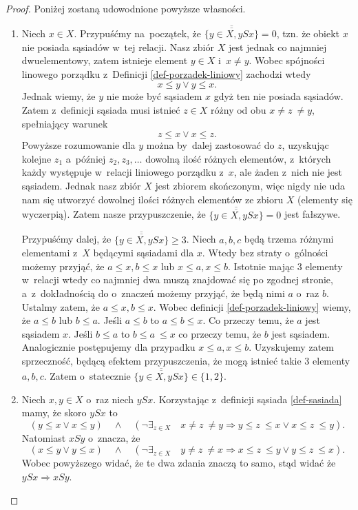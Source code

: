 \documentclass[12pt,a4paper]{report}
\newcommand{\licznosc}[1]{\overline{\overline{#1}}}
\begin{document}
\begin{proof}
Poniżej zostaną udowodnione powyższe własności.
\begin{enumerate}
\item Niech $x \in X$. Przypuśćmy na~początek, że $\licznosc{\{y \in X, ySx\}} = 0$, tzn. że obiekt $x$ nie posiada sąsiadów w~tej relacji. Nasz zbiór $X$ jest jednak co najmniej dwuelementowy, zatem istnieje element $y \in X$ i~$ x \neq y$. Wobec spójności linowego porządku z~Definicji \ref{def-porzadek-liniowy} zachodzi wtedy
$$ x \leq y \lor y \leq x.$$
Jednak wiemy, że $y$ nie może być sąsiadem $x$ gdyż ten nie posiada sąsiadów. Zatem z~definicji sąsiada musi istnieć $z \in X$ różny od obu $x \neq z~\neq y$, spełniający warunek
$$
z \leq x \lor x \leq z.
$$
Powyższe rozumowanie dla $y$ można by~dalej zastosować do $z$, uzyskując kolejne $z_1$ a~później $z_2,z_3, \ldots$ dowolną ilość różnych elementów, z~których każdy występuje w~relacji liniowego porządku z~$x$, ale żaden z~nich nie jest sąsiadem. Jednak nasz zbiór $X$ jest zbiorem skończonym, więc nigdy nie uda nam się utworzyć dowolnej ilości różnych elementów ze zbioru $X$ (elementy się wyczerpią). Zatem nasze przypuszczenie, że $\licznosc{\{y \in X, ySx\}} = 0$ jest fałszywe.

Przypuśćmy dalej, że $\licznosc{\{y \in X, ySx\}} \geq 3$. Niech $a,b,c$ będą trzema różnymi elementami z~$X$ będącymi sąsiadami dla $x$. Wtedy bez straty o~gólności możemy przyjąć, że $a \leq x, b \leq x$ lub $x \leq a, x \leq b$. Istotnie mając 3 elementy w~relacji wtedy co najmniej dwa muszą znajdować się po zgodnej stronie, a~z~dokładnością do o~znaczeń możemy przyjąć, że będą nimi $a$ o~raz $b$. Ustalmy zatem, że $a \leq x, b \leq x$. Wobec definicji \ref{def-porzadek-liniowy} wiemy, że $a \leq b$ lub $b \leq a$. Jeśli $a \leq b$ to $a \leq b \leq x$. Co przeczy temu, że $a$ jest sąsiadem $x$. Jeśli $b \leq a$ to $b \leq a~\leq x$ co przeczy temu, że $b$ jest sąsiadem. Analogicznie postępujemy dla przypadku $x \leq a, x \leq b$. Uzyskujemy zatem sprzeczność, będącą efektem przypuszczenia, że mogą istnieć takie 3 elementy $a,b,c$. Zatem o~statecznie $\licznosc{\{y \in X, ySx\}} \in \{ 1,2 \}$.

\item Niech $x,y \in X$ o~raz niech $ySx$. Korzystając z~definicji sąsiada \ref{def-sasiada} mamy, że skoro $ySx$ to  $$\left(y \leq x \lor x\leq y \right)\quad \land \quad  \left(\lnot \exists_{z \in X}  \quad x\neq z~\neq y \Rightarrow   y \leq z~\leq x \lor x \leq z~\leq y \right).$$ 
Natomiast $xSy$ o~znacza, że 
$$\left(x \leq y \lor y\leq x \right)\quad \land \quad  \left(\lnot \exists_{z \in X}  \quad y\neq z~\neq x \Rightarrow   x \leq z~\leq y \lor y \leq z~\leq x \right).$$ 
Wobec powyższego widać, że te dwa zdania znaczą to samo, stąd widać że  $ySx \Rightarrow xSy$. %


\end{enumerate}
\end{proof}
\end{document}
